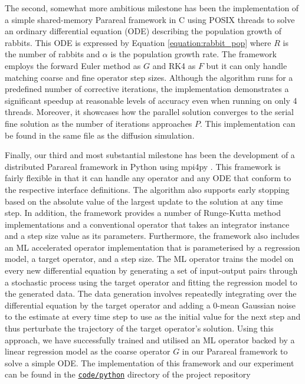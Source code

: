 \documentclass{article}
\begin{document}
The second, somewhat more ambitious milestone has been the implementation of a simple shared-memory Parareal framework in C using POSIX threads to solve an ordinary differential equation (ODE) describing the population growth of rabbits. This ODE is expressed by Equation \ref{equation:rabbit_pop} where $R$ is the number of rabbits and $\alpha$ is the population growth rate. The framework employs the forward Euler method as $G$ and RK4 as $F$ but it can only handle matching coarse and fine operator step sizes. Although the algorithm runs for a predefined number of corrective iterations, the implementation demonstrates a significant speedup at reasonable levels of accuracy even when running on only 4 threads. Moreover, it showcases how the parallel solution converges to the serial fine solution as the number of iterations approaches $P$. This implementation can be found in the same file as the diffusion simulation.

Finally, our third and most substantial milestone has been the development of a distributed Parareal framework in Python using mpi4py \cite{dalcin2005}. This framework is fairly flexible in that it can handle any operator and any ODE that conform to the respective interface definitions. The algorithm also supports early stopping based on the absolute value of the largest update to the solution at any time step. In addition, the framework provides a number of Runge-Kutta method implementations and a conventional operator that takes an integrator instance and a step size value as its parameters. Furthermore, the framework also includes an ML accelerated operator implementation that is parameterised by a regression model, a target operator, and a step size. The ML operator trains the model on every new differential equation by generating a set of input-output pairs through a stochastic process using the target operator and fitting the regression model to the generated data. The data generation involves repeatedly integrating over the differential equation by the target operator and adding a $0$-mean Gaussian noise to the estimate at every time step to use as the initial value for the next step and thus perturbate the trajectory of the target operator's solution. Using this approach, we have successfully trained and utilised an ML operator backed by a linear regression model as the coarse operator $G$ in our Parareal framework to solve a simple ODE. The implementation of this framework and our experiment can be found in the \href{https://git.ecdf.ed.ac.uk/msc-19-20/s1984842/blob/master/code/python/}{\texttt{code/python}} directory of the project repository
\end{document}
